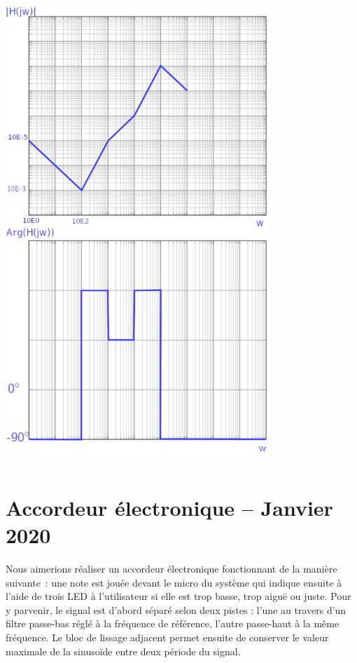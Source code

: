 \documentclass{../template/tp}
\begin{document}
{\begin{center}
\includegraphics[width=10cm]{elech301_bode.png}
\end{center}
}
\clearpage















\section*{Accordeur électronique -- Janvier 2020}

Nous aimerions réaliser un accordeur électronique fonctionnant de la manière suivante~: une note est jouée devant le micro du système qui indique ensuite à l'aide de trois LED à l'utilisateur si elle est trop basse, trop aiguë ou juste.
Pour y parvenir, le signal est d'abord séparé selon deux pistes : l'une au travers d'un filtre passe-bas réglé à la fréquence de référence, l'autre passe-haut à la même fréquence.
Le bloc de lissage adjacent permet ensuite de conserver le valeur maximale de la sinusoïde entre deux période du signal.
\end{document}
